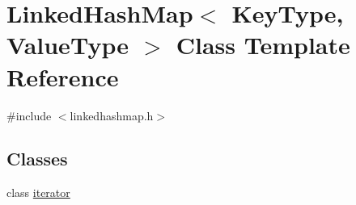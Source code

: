 \hypertarget{classLinkedHashMap}{}\section{Linked\+Hash\+Map$<$ Key\+Type, Value\+Type $>$ Class Template Reference}
\label{classLinkedHashMap}


{\ttfamily \#include $<$linkedhashmap.\+h$>$}

\subsection*{Classes}
\begin{DoxyCompactItemize}
\item 
class \mbox{\hyperlink{classLinkedHashMap_1_1iterator}{iterator}}
\end{DoxyCompactItemize}
